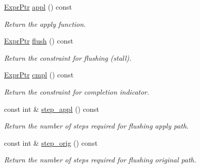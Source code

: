 \begin{DoxyCompactItemize}
\mbox{\hyperlink{namespaceilang_a7c4196c72e53ea4df4b7861af7bc3bce}{Expr\+Ptr}} \mbox{\hyperlink{classilang_1_1_refinement_map_aeb5a18fcf44126369725c7ba31e1d201}{appl}} () const
\begin{DoxyCompactList}\small\item\em Return the apply function. \end{DoxyCompactList}\item 
\mbox{\label{classilang_1_1_refinement_map_aef5fd6634b3dbefad911450b2c0deab1}} 
\mbox{\hyperlink{namespaceilang_a7c4196c72e53ea4df4b7861af7bc3bce}{Expr\+Ptr}} \mbox{\hyperlink{classilang_1_1_refinement_map_aef5fd6634b3dbefad911450b2c0deab1}{flush}} () const
\begin{DoxyCompactList}\small\item\em Return the constraint for flushing (stall). \end{DoxyCompactList}\item 
\mbox{\label{classilang_1_1_refinement_map_a2b23526ffff2ed62a69469b8a33d9581}} 
\mbox{\hyperlink{namespaceilang_a7c4196c72e53ea4df4b7861af7bc3bce}{Expr\+Ptr}} \mbox{\hyperlink{classilang_1_1_refinement_map_a2b23526ffff2ed62a69469b8a33d9581}{cmpl}} () const
\begin{DoxyCompactList}\small\item\em Return the constraint for completion indicator. \end{DoxyCompactList}\item 
\mbox{\label{classilang_1_1_refinement_map_aedf922d0bd7acf9d405bf5b52671c120}} 
const int \& \mbox{\hyperlink{classilang_1_1_refinement_map_aedf922d0bd7acf9d405bf5b52671c120}{step\+\_\+appl}} () const
\begin{DoxyCompactList}\small\item\em Return the number of steps required for flushing apply path. \end{DoxyCompactList}\item 
\mbox{\label{classilang_1_1_refinement_map_adc04e1195249f39144341d33d366044e}} 
const int \& \mbox{\hyperlink{classilang_1_1_refinement_map_adc04e1195249f39144341d33d366044e}{step\+\_\+orig}} () const
\begin{DoxyCompactList}\small\item\em Return the number of steps required for flushing original path. \end{DoxyCompactList}\item 

\end{DoxyCompactItemize}
